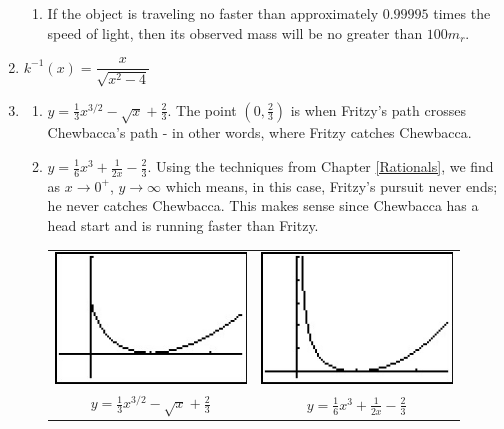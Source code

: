 \begin{enumerate}
\begin{enumerate}
\item If the object is traveling no faster than approximately $0.99995$ times the speed of light, then its observed mass will be no greater than $100m_{r}$.

\end{enumerate}


\item $k^{-1}(x) = \dfrac{x}{\sqrt{x^{2} - 4}}$

\item \begin{enumerate}

\item  $y = \frac{1}{3}x^{3/2} - \sqrt{x} + \frac{2}{3}$.  The point $\left(0,\frac{2}{3}\right)$ is when Fritzy's path crosses Chewbacca's path - in other words, where Fritzy catches Chewbacca.

\item $y = \frac{1}{6}x^3+\frac{1}{2x} - \frac{2}{3}$.  Using the techniques from Chapter \ref{Rationals}, we find as $x \rightarrow 0^{+}$, $y \rightarrow \infty$ which means, in this case, Fritzy's pursuit never ends;  he never catches Chewbacca. This makes sense since Chewbacca has a head start and is running faster than Fritzy.

\begin{center}

\begin{tabular}{cc}

\includegraphics[width=2in]{./FurtherGraphics/PURSUIT01.jpg} & \hspace{1in} \includegraphics[width=2in]{./FurtherGraphics/PURSUIT02.jpg}  \\

$y = \frac{1}{3}x^{3/2} - \sqrt{x} + \frac{2}{3}$ & \hspace{1in} $y = \frac{1}{6}x^3+\frac{1}{2x} - \frac{2}{3}$ \\

\end{tabular}

\end{center}

\end{enumerate}


\end{enumerate}

\closegraphsfile